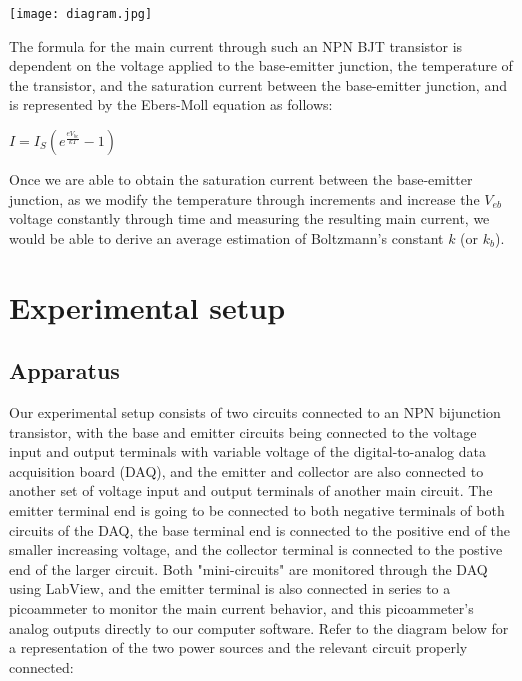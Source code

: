 \documentclass[10pt,letterpaper,onecolumn]{article}
\begin{document}
 \begin{center}
 \texttt{[image: diagram.jpg]}
 \label{fig:npn}
 \end{center}

 The formula for the main current through such an NPN BJT transistor is dependent on the voltage applied to the base-emitter junction, the temperature of the transistor, and the saturation current between the base-emitter junction, and is represented by the Ebers-Moll equation as follows:\\
 \begin{center}
    $I=I_S(e^{\frac{eV_{be}}{kT}}-1)$
\end{center}

Once we are able to obtain the saturation current between the base-emitter junction, as we modify the temperature through increments and increase the $V_{eb}$ voltage constantly through time and measuring the resulting main current, we would be able to derive an average estimation of Boltzmann's constant $k$ (or $k_b$).


\section{Experimental setup}

\subsection{Apparatus}

Our experimental setup consists of two circuits connected to an NPN bijunction transistor, with the base and emitter circuits being connected to the voltage input and output terminals with variable voltage of the digital-to-analog data acquisition board (DAQ), and the emitter and collector are also connected to another set of voltage input and output terminals of another main circuit. The emitter terminal end is going to be connected to both negative terminals of both circuits of the DAQ, the base terminal end is connected to the positive end of the smaller increasing voltage, and the collector terminal is connected to the postive end of the larger circuit. Both "mini-circuits" are monitored through the DAQ using LabView, and the emitter terminal is also connected in series to a picoammeter to monitor the main current behavior, and this picoammeter's analog outputs directly to our computer software. Refer to the diagram below for a representation of the two power sources and the relevant circuit properly connected:
\end{document}
